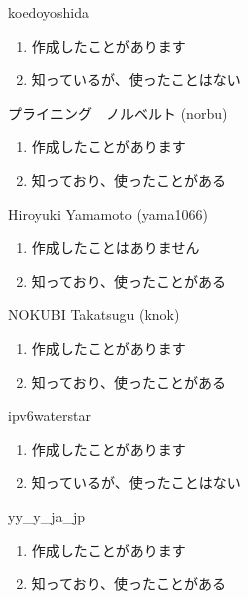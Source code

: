 \begin{prework}{ koedoyoshida }
  \begin{enumerate}
  \item 作成したことがあります
  \item 知っているが、使ったことはない
  \end{enumerate}
\end{prework}

\begin{prework}{ プライニング　ノルベルト (norbu) }
  \begin{enumerate}
  \item 作成したことがあります
  \item 知っており、使ったことがある
  \end{enumerate}
\end{prework}

\begin{prework}{ Hiroyuki Yamamoto (yama1066) }
  \begin{enumerate}
  \item 作成したことはありません
  \item 知っており、使ったことがある
  \end{enumerate}
\end{prework}

\begin{prework}{ NOKUBI Takatsugu (knok) }
  \begin{enumerate}
  \item 作成したことがあります
  \item 知っており、使ったことがある
  \end{enumerate}
\end{prework}

\begin{prework}{ ipv6waterstar }
  \begin{enumerate}
  \item 作成したことがあります
  \item 知っているが、使ったことはない
  \end{enumerate}
\end{prework}

\begin{prework}{ yy\_y\_ja\_jp }
  \begin{enumerate}
  \item 作成したことがあります
  \item 知っており、使ったことがある
  \end{enumerate}
\end{prework}

